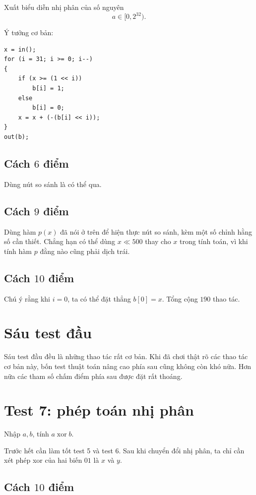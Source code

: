 \documentclass[11pt]{article}
\begin{document}
Xuất biểu diễn nhị phân của số nguyên
\[
  a\in [0,2^{32}).
\]

Ý tưởng cơ bản:
\begin{verbatim}
x = in();
for (i = 31; i >= 0; i--)
{
    if (x >= (1 << i))
        b[i] = 1;
    else
        b[i] = 0;
    x = x + (-(b[i] << i));
}
out(b);
\end{verbatim}

\subsection*{Cách $6$ điểm}

Dùng nút so sánh là có thể qua.

\subsection*{Cách $9$ điểm}

Dùng hàm $p(x)$ đã nói ở trên để hiện thực nút so sánh, kèm một số chỉnh hằng
số cần thiết. Chẳng hạn có thể dùng $x\ll 500$ thay cho $x$ trong tính toán,
vì khi tính hàm $p$ đằng nào cũng phải dịch trái.

\subsection*{Cách $10$ điểm}

Chú ý rằng khi $i=0$, ta có thể đặt thẳng $b[0]=x$. Tổng cộng $190$ thao tác.

\section{Sáu test đầu}

Sáu test đầu đều là những thao tác rất cơ bản. Khi đã chơi thật rõ các thao
tác cơ bản này, bốn test thuật toán nâng cao phía sau cũng không còn khó nữa.
Hơn nữa các tham số chấm điểm phía sau được đặt rất thoáng.

\section{Test 7: phép toán nhị phân}

Nhập $a,b$, tính $a\operatorname{ xor }b$.

Trước hết cần làm tốt test 5 và test 6. Sau khi chuyển đổi nhị phân, ta chỉ
cần xét phép xor của hai biến $01$ là $x$ và $y$.

\subsection*{Cách $10$ điểm}
\end{document}
